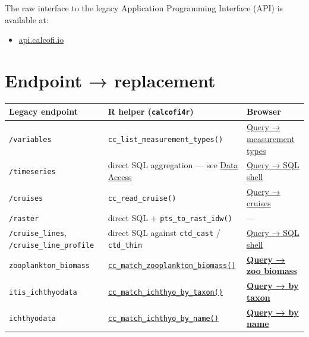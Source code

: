 \documentclass[
  letterpaper,
  DIV=11,
  numbers=noendperiod]{scrreprt}
\providecommand{\tightlist}{%
  \setlength{\itemsep}{0pt}\setlength{\parskip}{0pt}}
\begin{document}
The raw interface to the legacy Application Programming Interface (API)
is available at:

\begin{itemize}
\tightlist
\item
  \href{https://api.calcofi.io}{api.calcofi.io}
\end{itemize}

\section{Endpoint → replacement}\label{endpoint-replacement}

\begin{longtable}[]{@{}
  >{\raggedright\arraybackslash}p{}
  >{\raggedright\arraybackslash}p{}
  >{\raggedright\arraybackslash}p{}@{}}
\toprule\noalign{}
\begin{minipage}[b]{\linewidth}\raggedright
Legacy endpoint
\end{minipage} & \begin{minipage}[b]{\linewidth}\raggedright
R helper (\texttt{calcofi4r})
\end{minipage} & \begin{minipage}[b]{\linewidth}\raggedright
Browser
\end{minipage} \\
\midrule\noalign{}
\endhead
\bottomrule\noalign{}
\endlastfoot
\texttt{/variables} & \texttt{cc\_list\_measurement\_types()} &
\href{https://calcofi.io/db-query/\#browse--measurement-types}{Query →
measurement types} \\
\texttt{/timeseries} & direct SQL aggregation --- see
\hyperref[data-access]{Data Access} &
\href{https://calcofi.io/db-query/\#sql-shell--shell}{Query → SQL
shell} \\
\texttt{/cruises} & \texttt{cc\_read\_cruise()} &
\href{https://calcofi.io/db-query/\#browse--cruises}{Query → cruises} \\
\texttt{/raster} & direct SQL + \texttt{pts\_to\_rast\_idw()} & --- \\
\texttt{/cruise\_lines}, \texttt{/cruise\_line\_profile} & direct SQL
against \texttt{ctd\_cast} / \texttt{ctd\_thin} &
\href{https://calcofi.io/db-query/\#sql-shell--shell}{Query → SQL
shell} \\
\texttt{zooplankton\_biomass} &
\hyperref[matching-helpers]{\texttt{cc\_match\_zooplankton\_biomass()}}
&
\textbf{\href{https://calcofi.io/db-query/\#bio-env-matching--zoo-biomass}{Query
→ zoo biomass}} \\
\texttt{itis\_ichthyodata} &
\hyperref[matching-helpers]{\texttt{cc\_match\_ichthyo\_by\_taxon()}} &
\textbf{\href{https://calcofi.io/db-query/\#bio-env-matching--by-taxon}{Query
→ by taxon}} \\
\texttt{ichthyodata} &
\hyperref[matching-helpers]{\texttt{cc\_match\_ichthyo\_by\_name()}} &
\textbf{\href{https://calcofi.io/db-query/\#bio-env-matching--by-name}{Query
→ by name}} \\
\end{longtable}
\end{document}
